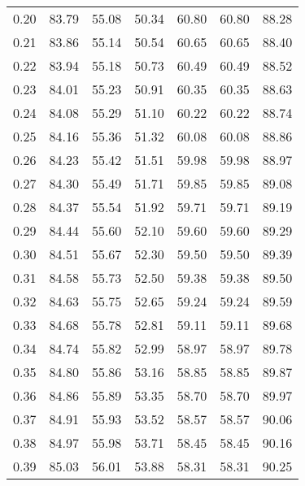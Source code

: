 \begin{tabular}{|c|c|c|c|c|c|c|}
      0.20 &     83.79 &     55.08 &      50.34 &   60.80 &      60.80 &         88.28 \\
      0.21 &     83.86 &     55.14 &      50.54 &   60.65 &      60.65 &         88.40 \\
      0.22 &     83.94 &     55.18 &      50.73 &   60.49 &      60.49 &         88.52 \\
      0.23 &     84.01 &     55.23 &      50.91 &   60.35 &      60.35 &         88.63 \\
      0.24 &     84.08 &     55.29 &      51.10 &   60.22 &      60.22 &         88.74 \\
      0.25 &     84.16 &     55.36 &      51.32 &   60.08 &      60.08 &         88.86 \\
      0.26 &     84.23 &     55.42 &      51.51 &   59.98 &      59.98 &         88.97 \\
      0.27 &     84.30 &     55.49 &      51.71 &   59.85 &      59.85 &         89.08 \\
      0.28 &     84.37 &     55.54 &      51.92 &   59.71 &      59.71 &         89.19 \\
      0.29 &     84.44 &     55.60 &      52.10 &   59.60 &      59.60 &         89.29 \\
      0.30 &     84.51 &     55.67 &      52.30 &   59.50 &      59.50 &         89.39 \\
      0.31 &     84.58 &     55.73 &      52.50 &   59.38 &      59.38 &         89.50 \\
      0.32 &     84.63 &     55.75 &      52.65 &   59.24 &      59.24 &         89.59 \\
      0.33 &     84.68 &     55.78 &      52.81 &   59.11 &      59.11 &         89.68 \\
      0.34 &     84.74 &     55.82 &      52.99 &   58.97 &      58.97 &         89.78 \\
      0.35 &     84.80 &     55.86 &      53.16 &   58.85 &      58.85 &         89.87 \\
      0.36 &     84.86 &     55.89 &      53.35 &   58.70 &      58.70 &         89.97 \\
      0.37 &     84.91 &     55.93 &      53.52 &   58.57 &      58.57 &         90.06 \\
      0.38 &     84.97 &     55.98 &      53.71 &   58.45 &      58.45 &         90.16 \\
      0.39 &     85.03 &     56.01 &      53.88 &   58.31 &      58.31 &         90.25 \\

\end{tabular}
